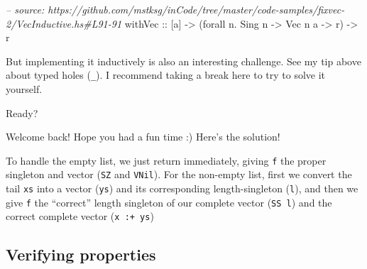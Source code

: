 \documentclass[]{article}
\newenvironment{Shaded}{}{}
\newcommand{\KeywordTok}[1]{\textcolor[rgb]{0.00,0.44,0.13}{\textbf{#1}}}
\newcommand{\DataTypeTok}[1]{\textcolor[rgb]{0.56,0.13,0.00}{#1}}
\newcommand{\CommentTok}[1]{\textcolor[rgb]{0.38,0.63,0.69}{\textit{#1}}}
\newcommand{\OtherTok}[1]{\textcolor[rgb]{0.00,0.44,0.13}{#1}}
\newcommand{\FunctionTok}[1]{\textcolor[rgb]{0.02,0.16,0.49}{#1}}
\newcommand{\NormalTok}[1]{#1}
\begin{document}
\begin{Shaded}
\begin{Highlighting}[]
\CommentTok{-- source: https://github.com/mstksg/inCode/tree/master/code-samples/fixvec-2/VecInductive.hs#L91-91}
\OtherTok{withVec ::}\NormalTok{ [a] }\OtherTok{->}\NormalTok{ (forall n}\FunctionTok{.} \DataTypeTok{Sing}\NormalTok{ n }\OtherTok{->} \DataTypeTok{Vec}\NormalTok{ n a }\OtherTok{->}\NormalTok{ r) }\OtherTok{->}\NormalTok{ r}
\end{Highlighting}
\end{Shaded}

But implementing it inductively is also an interesting challenge. See my tip
above about typed holes (\texttt{\_}). I recommend taking a break here to try to
solve it yourself.

Ready?

Welcome back! Hope you had a fun time :) Here's the solution!

\begin{Shaded}
\end{Shaded}

To handle the empty list, we just return immediately, giving \texttt{f} the
proper singleton and vector (\texttt{SZ} and \texttt{VNil}). For the non-empty
list, first we convert the tail \texttt{xs} into a vector (\texttt{ys}) and its
corresponding length-singleton (\texttt{l}), and then we give \texttt{f} the
``correct'' length singleton of our complete vector (\texttt{SS\ l}) and the
correct complete vector (\texttt{x\ :+\ ys})

\subsection{Verifying properties}\label{verifying-properties-1}
\end{document}
